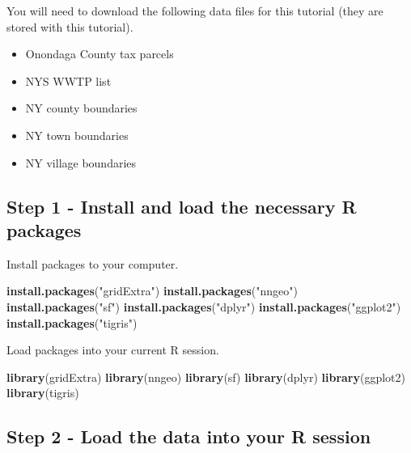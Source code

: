 \documentclass[
]{book}
\newenvironment{Shaded}{\begin{snugshade}}{\end{snugshade}}
\newcommand{\FunctionTok}[1]{\textcolor[rgb]{0.13,0.29,0.53}{\textbf{#1}}}
\newcommand{\NormalTok}[1]{#1}
\newcommand{\StringTok}[1]{\textcolor[rgb]{0.31,0.60,0.02}{#1}}
\begin{document}
You will need to download the following data files for this tutorial (they are stored with this tutorial).

\begin{itemize}
\item
  Onondaga County tax parcels
\item
  NYS WWTP list
\item
  NY county boundaries
\item
  NY town boundaries
\item
  NY village boundaries
\end{itemize}

\subsection{Step 1 - Install and load the necessary R packages}\label{step-1---install-and-load-the-necessary-r-packages}

Install packages to your computer.

\begin{Shaded}
\begin{Highlighting}[]
\FunctionTok{install.packages}\NormalTok{(}\StringTok{"gridExtra"}\NormalTok{)}
\FunctionTok{install.packages}\NormalTok{(}\StringTok{"nngeo"}\NormalTok{)}
\FunctionTok{install.packages}\NormalTok{(}\StringTok{"sf"}\NormalTok{)}
\FunctionTok{install.packages}\NormalTok{(}\StringTok{"dplyr"}\NormalTok{)}
\FunctionTok{install.packages}\NormalTok{(}\StringTok{"ggplot2"}\NormalTok{)}
\FunctionTok{install.packages}\NormalTok{(}\StringTok{"tigris"}\NormalTok{)}
\end{Highlighting}
\end{Shaded}

Load packages into your current R session.

\begin{Shaded}
\begin{Highlighting}[]
\FunctionTok{library}\NormalTok{(gridExtra)}
\FunctionTok{library}\NormalTok{(nngeo)}
\FunctionTok{library}\NormalTok{(sf)}
\FunctionTok{library}\NormalTok{(dplyr)}
\FunctionTok{library}\NormalTok{(ggplot2)}
\FunctionTok{library}\NormalTok{(tigris)}
\end{Highlighting}
\end{Shaded}

\subsection{Step 2 - Load the data into your R session}\label{step-2---load-the-data-into-your-r-session}
\end{document}
